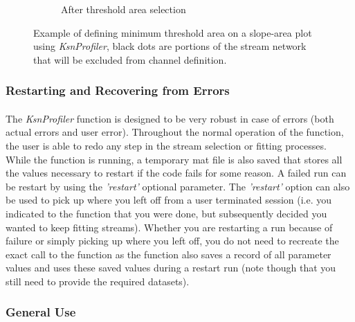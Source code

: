 \begin{figure}[H]
\begin{subfigure}{.5\textwidth}
		\caption{After threshold area selection}
		\label{fig:TSsub2}
	\end{subfigure}
	\caption{Example of defining minimum threshold area on a slope-area plot using \textit{KsnProfiler}, black dots are portions of the stream network that will be excluded from channel definition.}
	\label{fig:ThreshSelect}
\end{figure}

\subsubsection{Restarting and Recovering from Errors}
\paragraph{}The \textit{KsnProfiler} function is designed to be very robust in case of errors (both actual errors and user error). Throughout the normal operation of the function, the user is able to redo any step in the stream selection or fitting processes. While the function is running, a temporary mat file is also saved that stores all the values necessary to restart if the code fails for some reason. A failed run can be restart by using the \textit{'restart'} optional parameter. The \textit{'restart'} option can also be used to pick up where you left off from a user terminated session (i.e. you indicated to the function that you were done, but subsequently decided you wanted to keep fitting streams). Whether you are restarting a run because of failure or simply picking up where you left off, you do not need to recreate the exact call to the function as the function also saves a record of all parameter values and uses these saved values during a restart run (note though that you still need to provide the required datasets).

\subsubsection{General Use}
